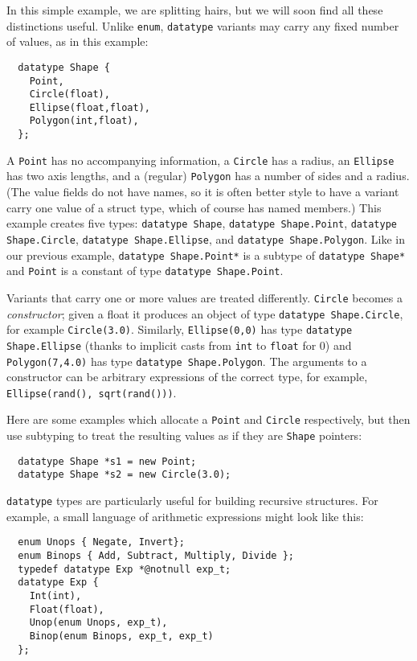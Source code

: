 In this simple example, we are splitting hairs, but we will soon find
all these distinctions useful.  Unlike \texttt{enum}, \texttt{datatype}
variants may carry any fixed number of values, as in this example:

\begin{verbatim}
  datatype Shape {
    Point,
    Circle(float),
    Ellipse(float,float),
    Polygon(int,float),
  };
\end{verbatim}

A \texttt{Point} has no accompanying information, a \texttt{Circle} has a
radius, an \texttt{Ellipse} has two axis lengths, and a (regular)
\texttt{Polygon} has a number of sides and a radius.  (The value fields
do not have names, so it is often better style to have a variant carry
one value of a struct type, which of course has named members.)  This
example creates five types: \texttt{datatype Shape},
\texttt{datatype Shape.Point}, \texttt{datatype Shape.Circle},
\texttt{datatype Shape.Ellipse}, and \texttt{datatype Shape.Polygon}.  Like in
our previous example, \texttt{datatype Shape.Point*} is a subtype of
\texttt{datatype Shape*} and \texttt{Point} is a constant of
type \texttt{datatype Shape.Point}.

Variants that carry one or more values are treated differently.
\texttt{Circle} becomes a \textit{constructor}; given a float it produces an
object of type \texttt{datatype Shape.Circle}, for example \texttt{Circle(3.0)}.
Similarly, \texttt{Ellipse(0,0)} has type \texttt{datatype Shape.Ellipse}
(thanks to implicit casts from \texttt{int} to \texttt{float} for 0) and
\texttt{Polygon(7,4.0)} has type \texttt{datatype Shape.Polygon}.  The
arguments to a constructor can be arbitrary expressions of the correct
type, for example, \texttt{Ellipse(rand(), sqrt(rand()))}.

Here are some examples which allocate a \texttt{Point} and \texttt{Circle}
respectively, but then use subtyping to treat the resulting values
as if they are \texttt{Shape} pointers:
\begin{verbatim}
  datatype Shape *s1 = new Point;
  datatype Shape *s2 = new Circle(3.0);
\end{verbatim}

\texttt{datatype} types are particularly useful for building recursive
structures.  For example, a small language of arithmetic expressions
might look like this:
\begin{verbatim}
  enum Unops { Negate, Invert};
  enum Binops { Add, Subtract, Multiply, Divide };
  typedef datatype Exp *@notnull exp_t;
  datatype Exp {
    Int(int),
    Float(float),
    Unop(enum Unops, exp_t),
    Binop(enum Binops, exp_t, exp_t)
  };
\end{verbatim}

